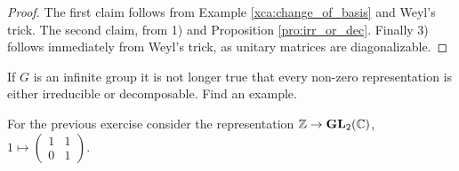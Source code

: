 \begin{proof}
	The first claim follows from Example \ref{xca:change_of_basis} and 
	Weyl's trick. The second claim, from 1) and
	Proposition \ref{pro:irr_or_dec}. Finally 3) follows immediately 
	from Weyl's trick, as unitary matrices are diagonalizable.  
\end{proof}

\begin{exercise}
\label{xca:not_decomposable}
    If $G$ is an infinite group it is not longer true that every non-zero representation
    is either irreducible or decomposable. Find an example.
\end{exercise}

For the previous exercise consider the representation $\mathbb{Z}\to\mathbf{GL}_2(\mathbb{C})$, 
$1\mapsto\begin{pmatrix}1&1\\0&1\end{pmatrix}$. 
